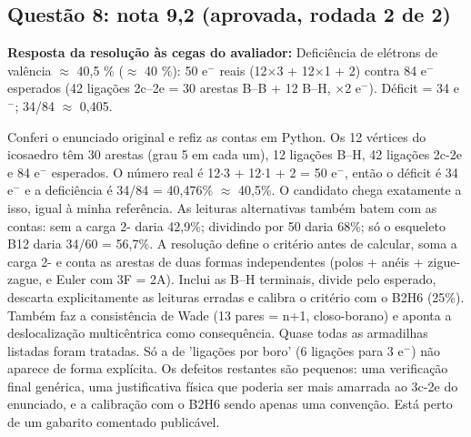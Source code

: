 \documentclass{article}%
\begin{document}
\subsection*{Questão 8: nota 9,2 (aprovada, rodada 2 de 2)}%
\textbf{Resposta da resolução às cegas do avaliador:} Deficiência de elétrons de valência $\approx$ 40,5 \% ($\approx$ 40 \%): 50 e$^{-}$ reais (12$\times$3 + 12$\times$1 + 2) contra 84 e$^{-}$ esperados (42 ligações 2c--2e = 30 arestas B--B + 12 B--H, $\times$2 e$^{-}$). Déficit = 34 e$^{-}$; 34/84 $\approx$ 0,405.\par %
Conferi o enunciado original e refiz as contas em Python. Os 12 vértices do icosaedro têm 30 arestas (grau 5 em cada um), 12 ligações B--H, 42 ligações 2c{-}2e e 84 e$^{-}$ esperados. O número real é 12$\cdot$3 + 12$\cdot$1 + 2 = 50 e$^{-}$, então o déficit é 34 e$^{-}$ e a deficiência é 34/84 = 40,476\% $\approx$ 40,5\%. O candidato chega exatamente a isso, igual à minha referência. As leituras alternativas também batem com as contas: sem a carga 2- daria 42,9\%; dividindo por 50 daria 68\%; só o esqueleto B12 daria 34/60 = 56,7\%. A resolução define o critério antes de calcular, soma a carga 2- e conta as arestas de duas formas independentes (polos + anéis + zigue{-}zague, e Euler com 3F = 2A). Inclui as B--H terminais, divide pelo esperado, descarta explicitamente as leituras erradas e calibra o critério com o B2H6 (25\%). Também faz a consistência de Wade (13 pares = n+1, closo{-}borano) e aponta a deslocalização multicêntrica como consequência. Quase todas as armadilhas listadas foram tratadas. Só a de 'ligações por boro' (6 ligações para 3 e$^{-}$) não aparece de forma explícita. Os defeitos restantes são pequenos: uma verificação final genérica, uma justificativa física que poderia ser mais amarrada ao 3c{-}2e do enunciado, e a calibração com o B2H6 sendo apenas uma convenção. Está perto de um gabarito comentado publicável.%
\end{document}
